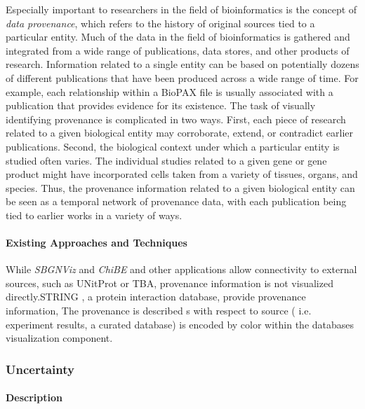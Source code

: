 Especially important to researchers in the field of bioinformatics is the concept of \textit{data provenance}, which refers to the history of original sources tied to a particular entity.
Much of the data in the field of bioinformatics is gathered and integrated from a wide range of publications, data stores, and other products of research.
Information related to a single entity can be based on potentially dozens of different publications that have been produced across a wide range of time.
For example, each relationship within a BioPAX file is usually associated with a publication that provides evidence for its existence.
The task of visually identifying provenance is complicated in two ways.
First, each piece of research related to a given biological entity may corroborate, extend, or contradict earlier publications.
Second, the biological context under which a particular entity is studied often varies.
The individual studies related to a given gene or gene product might have incorporated cells taken from a variety of tissues, organs, and species.
Thus, the provenance information related to a given biological entity can be seen as a temporal network of provenance data, with each publication being tied to earlier works in a variety of ways.

\paragraph*{Existing Approaches and Techniques}

While \textit{SBGNViz} \cite{SBGNViz2015} and \textit{ChiBE}\cite{Babur2010chibe} and other applications allow connectivity to external sources, such as UNitProt or TBA, provenance information is not visualized directly.STRING \cite{STRING2005}, a protein interaction database, provide provenance information,  The provenance is described s with respect to source ( i.e. experiment results, a curated database) is encoded by color within the databases visualization component.

\subsubsection*{Uncertainty}

\paragraph*{Description}

